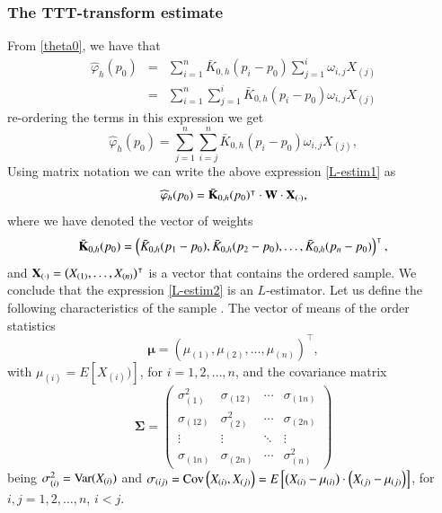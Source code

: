 \documentclass[preprint,12pt]{elsarticle}
\begin{document}
\subsubsection*{The TTT-transform estimate}
\noindent From \eqref{theta0}, we have that
\begin{eqnarray*}
\widehat{\varphi}_h(p_0)&=&\sum_{i=1}^n \bar{K}_{0,h}(p_i-p_0)\sum_{j=1}^i\omega_{i,j}X_{(j)} \\
&=& \sum_{i=1}^n \sum_{j=1}^i \bar{K}_{0,h}(p_i-p_0)\omega_{i,j}X_{(j)} 
\end{eqnarray*}
re-ordering the terms in this expression we get
\begin{equation}\label{L-estim1}
\widehat{\varphi}_h(p_0)=  \sum_{j=1}^n \sum_{i=j}^n \bar{K}_{0,h}(p_i-p_0)\omega_{i,j}X_{(j)}, 
\end{equation}
Using matrix notation we can write the above expression \eqref{L-estim1} as 
\begin{equation}\label{L-estim2}
\widehat{\varphi}_h(p_0)=  \bar{\bf K}_{0,h}(p_0)^{\intercal} \cdot {\bf W} \cdot{\bf X}_{(\cdot)}, 
\end{equation}
where we have denoted the vector of weights 
$$\bar{\bf K}_{0,h}(p_0)=\left(\bar{K}_{0,h}(p_1-p_0), \bar{K}_{0,h}(p_2-p_0),\ldots,\bar{ K}_{0,h}(p_n-p_0)\right)^{\intercal},$$ and ${\bf X}_{(\cdot)}=\left(X_{(1)},\ldots,X_{(n)}\right)^{\intercal}$ is a vector that contains the ordered sample. 
%
\vskip0.3cm
We conclude that the expression \eqref{L-estim2} is an $L$-estimator. Let us define the following characteristics of the sample . 
 The vector of means of the order statistics 
\begin{equation}\label{mean}
\boldsymbol{\mu}=\left({\mu}_{(1)},{\mu}_{(2)},\ldots,{\mu}_{(n)}\right)^{\intercal}, 
\end{equation}
with $\mu_{(i)}=E\left[X_{(i)})\right]$, for $i=1,2,\ldots,n$, and the covariance matrix 
\begin{equation}\label{var}
{\boldsymbol{\Sigma}}=\left(\begin{array}{cccc}
\sigma_{(1)}^2 & \sigma_{(12)} & \cdots & \sigma_{(1n)} \\
\sigma_{(12)} & \sigma_{(2)}^2 & \cdots & \sigma_{(2n)} \\
\vdots & \vdots & \ddots & \vdots \\
\sigma_{(1n)} & \sigma_{(2n)} & \cdots & \sigma_{(n)}^2
\end{array}\right)
\end{equation}
being $\sigma_{(i)}^2={\rm Var}(X_{(i)})$ and $\sigma_{(ij)}={\rm Cov} \left(X_{(i)},X_{(j)} \right)=E\left[\left(X_{(i)}-\mu_{(i)}\right)\cdot\left(X_{(j)}-\mu_{(j)} \right)\right]$, for $i, j= 1,2,\ldots,n$, $i<j$.
\end{document}
